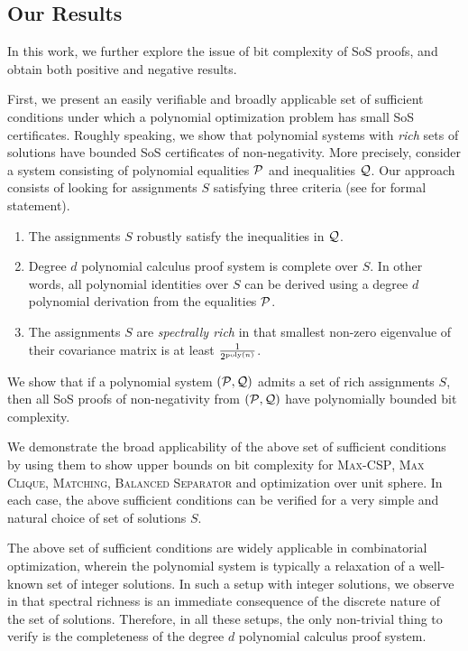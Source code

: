 \subsection{Our Results}

In this work, we further explore the issue of bit complexity of SoS proofs, and obtain both positive and negative results.
%

First, we present an easily verifiable and broadly applicable set of sufficient conditions under which a polynomial optimization problem has small SoS certificates.
%
Roughly speaking, we show that polynomial systems with {\it rich} sets of solutions have bounded SoS certificates of non-negativity.
%
More precisely, consider a system consisting of polynomial equalities $\mathcal P$ and inequalities $\mathcal Q$.  Our approach consists of looking for assignments $S$ satisfying three criteria (see  for formal statement).  
\begin{enumerate}
\item The assignments $S$ robustly satisfy the inequalities in $\mathcal Q$.  
\item Degree $d$ polynomial calculus proof system is complete over $S$.  In other words, all polynomial identities over $S$ can be derived using a degree $d$ polynomial derivation from the equalities $\mathcal P$.
\item The assignments $S$ are {\it spectrally rich} in that smallest non-zero eigenvalue of their covariance matrix is at least $\frac{1}{2^{\operatorname{poly}(n)}}$. 
\end{enumerate}
We show that if a polynomial system $(\mathcal P,\mathcal Q)$ admits a set of rich assignments $S$, then all SoS proofs of non-negativity from $(\mathcal P, \mathcal Q)$ have polynomially bounded bit complexity. 

We demonstrate the broad applicability of the above set of sufficient conditions by using them to show upper bounds on bit complexity for \textsc{Max-CSP}, \textsc{Max Clique}, \textsc{Matching}, \textsc{Balanced Separator} and optimization over unit sphere.  In each case, the above sufficient conditions can be verified for a very simple and natural choice of set of solutions $S$. 
%

The above set of sufficient conditions are widely applicable in combinatorial optimization, wherein the polynomial system is typically a relaxation of a well-known set of integer solutions.  
%
In such a setup with integer solutions, we observe in  that spectral richness is an immediate consequence of the discrete nature of the set of solutions.
%
Therefore, in all these setups, the only non-trivial thing to verify is the completeness of the degree $d$ polynomial calculus proof system.
%


